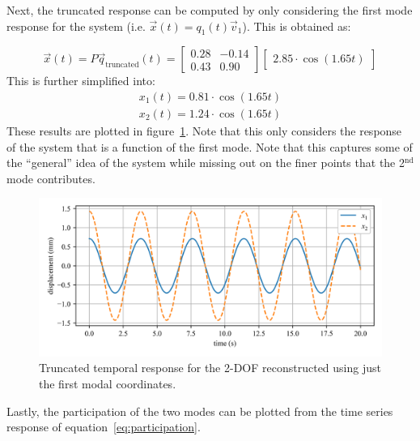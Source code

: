 \documentclass[12pt,letter]{article}
\begin{document}
\begin{example}
	Next, the truncated response can be computed by only considering the first mode response for the system (i.e. $\vec{x}(t) = q_1(t) \vec{v}_1$). This is obtained as:
	
	\begin{equation}
	\vec{x}(t) = P\vec{q}_\text{truncated}(t) = \begin{bmatrix} 0.28 & -0.14 \\    0.43  & 0.90 \end{bmatrix}  \begin{bmatrix} 2.85 \cdot \cos (1.65 t) \end{bmatrix}
	\end{equation}
	This is further simplified into:
	\begin{eqnarray}
	x_1(t) = 0.81 \cdot \cos (1.65 t) \\ 
	x_2(t) = 1.24 \cdot \cos (1.65 t) \nonumber
	\end{eqnarray}
	These results are plotted in figure~\ref{fig:modal_analysis_free_vibration_truncated}. Note that this only considers the response of the system that is a function of the first mode. Note that this captures some of the ``general'' idea of the system while missing out on the finer points that the 2$^{\text{nd}}$ mode contributes. 
	
	\begin{figure}[H]
		\centering
		\includegraphics[width=\linewidth]{../figures/modal_analysis_free_vibration_truncated.png}
		\caption{Truncated temporal response for the 2-DOF reconstructed using just the first modal coordinates.}
		\label{fig:modal_analysis_free_vibration_truncated}
	\end{figure}
	
	Lastly, the participation of the two modes can be plotted from the time series response of equation~\ref{eq:participation}.
	

\end{example}
\end{document}

